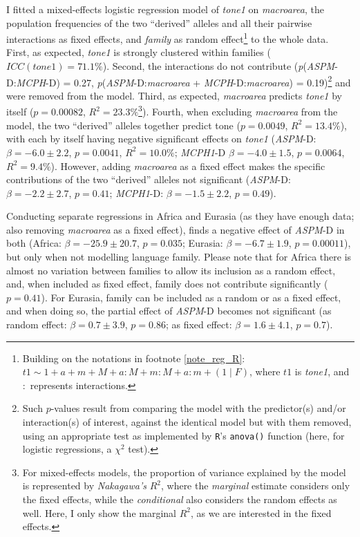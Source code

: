 \documentclass[twoside,onecolumn]{article}
\begin{document}
I fitted a mixed-effects logistic regression model of \textit{tone1} on \textit{macroarea}, the population frequencies of the two ``derived'' alleles and all their pairwise interactions as fixed effects, and \textit{family} as random effect\footnote{Building on the notations in footnote \ref{note_reg_R}: $t1 \sim 1 + a + m +  M + a:M + m:M + a:m + (1 \mid F)$, where $t1$ is \textit{tone1}, and $:$ represents interactions.} to the whole data.
First, as expected, \textit{tone1} is strongly clustered within families ($ICC(tone1) = 71.1\%$).
Second, the interactions do not contribute (\textit{p}(\textit{ASPM}-D:\textit{MCPH}-D) = 0.27, \textit{p}(\textit{ASPM}-D:\textit{macroarea} + \textit{MCPH}-D:\textit{macroarea}) = 0.19)\footnote{Such $p$-values result from comparing the model with the predictor(s) and/or interaction(s) of interest, against the identical model but with them removed, using an appropriate test as implemented by \texttt{R}'s \texttt{anova()} function (here, for logistic regressions, a $\chi^2$ test).} and were removed from the model.
Third, as expected, \textit{macroarea} predicts \textit{tone1} by itself ($p = 0.00082$, $R^2 = 23.3\%$\footnote{For mixed-effects models, the proportion of variance explained by the model is represented by \emph{Nakagawa's} $R^2$, where the \emph{marginal} estimate considers only the fixed effects, while the \emph{conditional} also considers the random effects as well. Here, I only show the marginal $R^2$, as we are interested in the fixed effects.}).
Fourth, when excluding \textit{macroarea} from the model, the two ``derived'' alleles together predict tone ($p = 0.0049$, $R^2 = 13.4\%$), with each by itself having negative significant effects on \textit{tone1} (\textit{ASPM}-D: $\beta = -6.0 \pm 2.2$, $p = 0.0041$, $R^2 = 10.0\%$; \textit{MCPH1}-D $\beta = -4.0 \pm 1.5$, $p = 0.0064$, $R^2 = 9.4\%$).
However, adding \textit{macroarea} as a fixed effect makes the specific contributions of the two ``derived'' alleles not significant (\textit{ASPM}-D: $\beta = -2.2 \pm 2.7$, $p = 0.41$; \textit{MCPH1}-D: $\beta = -1.5 \pm 2.2$, $p = 0.49$).

Conducting separate regressions in Africa and Eurasia (as they have enough data; also removing \textit{macroarea} as a fixed effect), finds a negative effect of \textit{ASPM}-D in both (Africa: $\beta = -25.9 \pm 20.7$, $p = 0.035$; Eurasia: $\beta = -6.7 \pm 1.9$, $p = 0.00011$), but only when not modelling language family.
Please note that for Africa there is almost no variation between families to allow its inclusion as a random effect, and, when included as fixed effect, family does not contribute significantly ($p = 0.41$).
For Eurasia, family can be included as a random or as a fixed effect, and when doing so, the partial effect of \textit{ASPM}-D becomes not significant (as random effect: $\beta = 0.7 \pm 3.9$, $p = 0.86$; as fixed effect: $\beta = 1.6 \pm 4.1$, $p = 0.7$).
\end{document}
